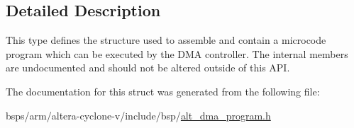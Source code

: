 \subsection{Detailed Description}
This type defines the structure used to assemble and contain a microcode program which can be executed by the D\+MA controller. The internal members are undocumented and should not be altered outside of this A\+PI. 

The documentation for this struct was generated from the following file\+:\begin{DoxyCompactItemize}
\item 
bsps/arm/altera-\/cyclone-\/v/include/bsp/\mbox{\hyperlink{alt__dma__program_8h}{alt\+\_\+dma\+\_\+program.\+h}}\end{DoxyCompactItemize}
